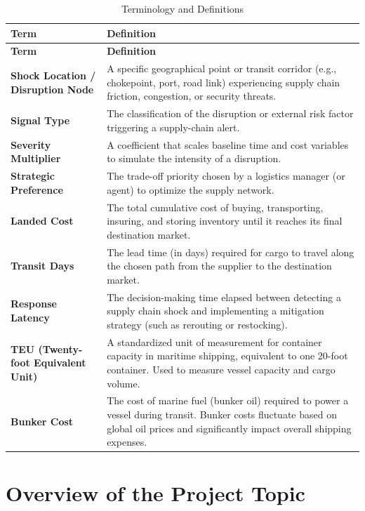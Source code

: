 \renewcommand{\arraystretch}{1.3}
\begin{longtable}{|p{}|p{}|}
\hline
\textbf{Term} & \textbf{Definition} \\
\hline
\endfirsthead
\hline
\textbf{Term} & \textbf{Definition} \\
\hline
\endhead
\hline
\endfoot
\caption{Terminology and Definitions}
\label{tab:terminology}
\endlastfoot
\textbf{Shock Location / Disruption Node} & A specific geographical point or transit corridor (e.g., chokepoint, port, road link) experiencing supply chain friction, congestion, or security threats. \\
\hline
\textbf{Signal Type} & The classification of the disruption or external risk factor triggering a supply-chain alert. \\
\hline
\textbf{Severity Multiplier} & A coefficient that scales baseline time and cost variables to simulate the intensity of a disruption.\\
\hline
\textbf{Strategic Preference} & The trade-off priority chosen by a logistics manager (or agent) to optimize the supply network. \\
\hline
\textbf{Landed Cost} & The total cumulative cost of buying, transporting, insuring, and storing inventory until it reaches its final destination market. \\
\hline
\textbf{Transit Days} & The lead time (in days) required for cargo to travel along the chosen path from the supplier to the destination market. \\
\hline
\textbf{Response Latency} & The decision-making time elapsed between detecting a supply chain shock and implementing a mitigation strategy (such as rerouting or restocking). \\
\hline
\textbf{TEU (Twenty-foot Equivalent Unit)} & A standardized unit of measurement for container capacity in maritime shipping, equivalent to one 20-foot container. Used to measure vessel capacity and cargo volume. \\
\hline
\textbf{Bunker Cost} & The cost of marine fuel (bunker oil) required to power a vessel during transit. Bunker costs fluctuate based on global oil prices and significantly impact overall shipping expenses. \\
\hline
\end{longtable}

\section[Overview of the Project Topic]{\textbf{Overview of the Project Topic}}

